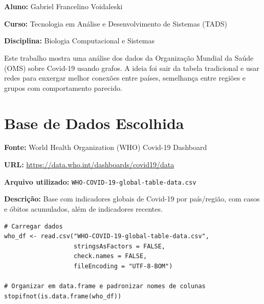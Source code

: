 \documentclass[12pt,a4paper]{article}
\begin{document}
\section{}

\textbf{Aluno:} Gabriel Francelino Voidaleski

\textbf{Curso:} Tecnologia em Análise e Desenvolvimento de Sistemas (TADS)

\textbf{Disciplina:} Biologia Computacional e Sistemas

\vspace{0.5cm}

Este trabalho mostra uma análise dos dados da Organização Mundial da Saúde (OMS) sobre Covid-19 usando grafos. A ideia foi sair da tabela tradicional e usar redes para enxergar melhor conexões entre países, semelhança entre regiões e grupos com comportamento parecido.

\section{Base de Dados Escolhida}

\textbf{Fonte:} World Health Organization (WHO) Covid-19 Dashboard

\textbf{URL:} \url{https://data.who.int/dashboards/covid19/data}

\textbf{Arquivo utilizado:} \texttt{WHO-COVID-19-global-table-data.csv}

\textbf{Descrição:} Base com indicadores globais de Covid-19 por país/região, com casos e óbitos acumulados, além de indicadores recentes.

\begin{lstlisting}
# Carregar dados
who_df <- read.csv("WHO-COVID-19-global-table-data.csv",
                   stringsAsFactors = FALSE,
                   check.names = FALSE,
                   fileEncoding = "UTF-8-BOM")

# Organizar em data.frame e padronizar nomes de colunas
stopifnot(is.data.frame(who_df))
\end{lstlisting}

\end{document}
